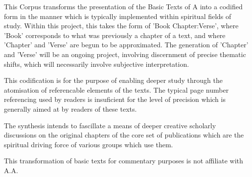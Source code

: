 \onecolumn


\begingroup \fontsize{12pt}{11pt}\selectfont

This Corpus transforms the presentation of the Basic Texts of A 
    into a codified form in the manner which is typically implemented within spiritual fields of study.
Within this project, this takes the form of 'Book Chapter:Verse', 
    where 'Book' corresponds to what was previously a chapter of a text, 
    and where 'Chapter' and 'Verse' are begun to be approximated.
The generation of 'Chapter' and 'Verse' will be an ongoing project,
    involving discernment of precise thematic shifts,
    which will necessarily involve subjective interpretation.

This codification is for the purpose of enabling deeper study 
    through the atomisation of referencable elements of the texts. 
The typical page number referencing used by readers 
    is insuficient for the level of precision 
    which is generally aimed at by readers of these texts.

The synthesis intends to fascillate a means of deeper creative scholarly discussions 
    on the original chapters of the core set of publications 
    which are the spiritual driving force of various groups which use them.

This transformation of basic texts for commentary purposes is not affiliate with A.A.

\clearpage

